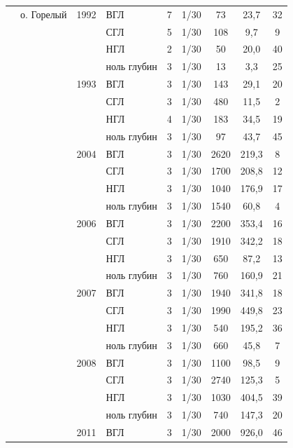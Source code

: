 \begin{footnotesize}
\begin{center}
\begin{longtable}{|p{1.6cm}|p{2.3cm}|p{1cm}|p{2cm}|p{1.5cm}|p{1.3cm}|*{3}{c|}}
		 & о. Горелый & 1992 & ВГЛ & 7 & 1/30 & 73 & 23,7 & 32
		\\ \cline{4-9}
		 &  &  & СГЛ & 5 & 1/30 & 108 & 9,7 & 9
		\\ \cline{4-9}
		 &  &  & НГЛ & 2 & 1/30 & 50 & 20,0 & 40
		\\ \cline{4-9}
		 &  &  & ноль глубин & 3 & 1/30 & 13 & 3,3 & 25
		\\ \cline{3-9}
		 &  & 1993 & ВГЛ & 3 & 1/30 & 143 & 29,1 & 20
		\\ \cline{4-9}
		 &  &  & СГЛ & 3 & 1/30 & 480 & 11,5 & 2
		\\ \cline{4-9}
		 &  &  & НГЛ & 4 & 1/30 & 183 & 34,5 & 19
		\\ \cline{4-9}
		 &  &  & ноль глубин & 3 & 1/30 & 97 & 43,7 & 45
		\\ \cline{3-9}
		 &  & 2004 & ВГЛ & 3 & 1/30 & 2620 & 219,3 & 8
		\\ \cline{4-9}
		 &  &  & СГЛ & 3 & 1/30 & 1700 & 208,8 & 12
		\\ \cline{4-9}
		 &  &  & НГЛ & 3 & 1/30 & 1040 & 176,9 & 17
		\\ \cline{4-9}
		 &  &  & ноль глубин & 3 & 1/30 & 1540 & 60,8 & 4
		\\ \cline{3-9}
		 &  & 2006 & ВГЛ & 3 & 1/30 & 2200 & 353,4 & 16
		\\ \cline{4-9}
		 &  &  & СГЛ & 3 & 1/30 & 1910 & 342,2 & 18
		\\ \cline{4-9}
		 &  &  & НГЛ & 3 & 1/30 & 650 & 87,2 & 13
		\\ \cline{4-9}
		 &  &  & ноль глубин & 3 & 1/30 & 760 & 160,9 & 21
		\\ \cline{3-9}
		 &  & 2007 & ВГЛ & 3 & 1/30 & 1940 & 341,8 & 18
		\\ \cline{4-9}
		 &  &  & СГЛ & 3 & 1/30 & 1990 & 449,8 & 23
		\\ \cline{4-9}
		 &  &  & НГЛ & 3 & 1/30 & 540 & 195,2 & 36
		\\ \cline{4-9}
		 &  &  & ноль глубин & 3 & 1/30 & 660 & 45,8 & 7
		\\ \cline{3-9}
		 &  & 2008 & ВГЛ & 3 & 1/30 & 1100 & 98,5 & 9
		\\ \cline{4-9}
		 &  &  & СГЛ & 3 & 1/30 & 2740 & 125,3 & 5
		\\ \cline{4-9}
		 &  &  & НГЛ & 3 & 1/30 & 1030 & 404,5 & 39
		\\ \cline{4-9}
		 &  &  & ноль глубин & 3 & 1/30 & 740 & 147,3 & 20
		\\ \cline{3-9}
		 &  & 2011 & ВГЛ & 3 & 1/30 & 2000 & 926,0 & 46
		\\ \cline{4-9}

\end{longtable}
\end{center}
\end{footnotesize}
